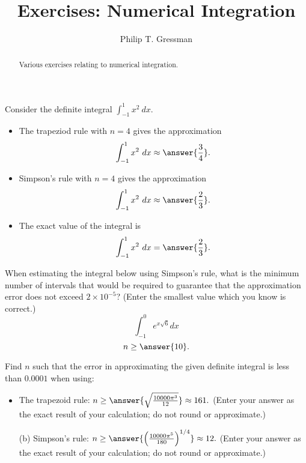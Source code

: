\documentclass{ximera}
\title{Exercises: Numerical Integration}
\author{Philip T. Gressman}
\begin{document}
\begin{abstract}
Various exercises relating to numerical integration.
\end{abstract}
\maketitle

\begin{exercise}%
Consider the definite integral  \(\displaystyle \int_{-1}^1 x^2\ dx\).
\begin{itemize}
\item	 The trapeziod rule with \(n=4\) gives the approximation
\[ \int_{-1}^1 x^2 \ dx \approx \answer{\frac{3}{4}}. \]
\item	Simpson's rule with \(n=4\) gives the approximation
\[ \int_{-1}^1 x^2 \ dx \approx \answer{\frac{2}{3}}. \]
\item	The exact value of the integral is
\[ \int_{-1}^1 x^2 \ dx = \answer{\frac{2}{3}}. \]
\end{itemize}
\end{exercise}

\begin{exercise}%
When estimating the integral below using Simpson's rule, what is the minimum number of intervals that would be required to guarantee that the approximation error does not exceed $2 \times 10^{-5}$? (Enter the smallest value which you know is correct.)
\[ \int_{-1}^0 e^{x \sqrt{6}} dx \]
\[ n \geq \answer{10}. \]
\end{exercise}

\begin{exercise}%
Find \(n\) such that the error in approximating the given definite integral is less than \(0.0001\) when using:
\begin{itemize}
\item The trapezoid rule: $n \geq \answer{\sqrt{\frac{10000 \pi^3}{12}}} \approx 161.$ (Enter your answer as the exact result of your calculation; do not round or approximate.)
\item [(b)] Simpson's rule: $n \geq \answer{\left(\frac{10000 \pi^5}{180}\right)^{1/4}} \approx 12.$ (Enter your answer as the exact result of your calculation; do not round or approximate.)
\end{itemize}
\end{exercise}
\end{document}
